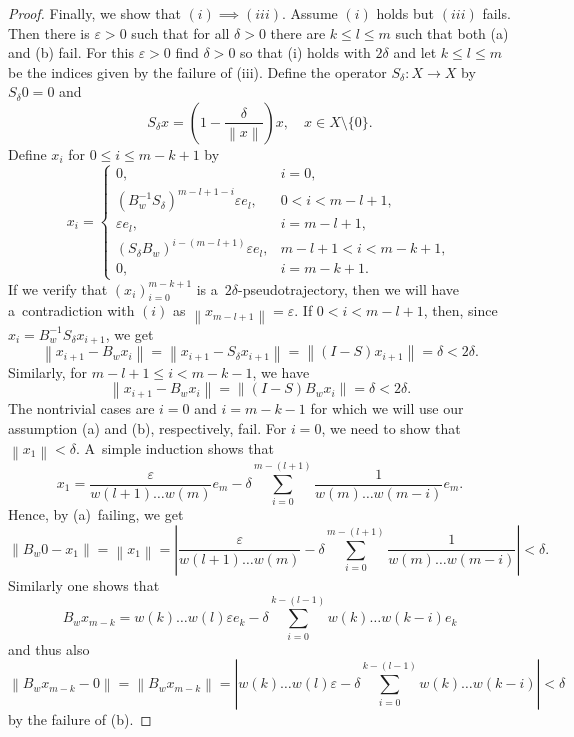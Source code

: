 \documentclass[11pt,a4paper]{amsart}
\theoremstyle{definition}
\newcommand{\eps}{\varepsilon}
\newcommand{\abs}[1]{\left| #1 \right|}
\newcommand{\norm}[1]{\left\| #1 \right\|}
\begin{document}
\begin{proof}
		Finally, we show that $(i) \implies (iii)$. Assume $(i)$ holds but $(iii)$ fails. Then there is $\eps > 0$ such that for all $\delta > 0$ there are $k \leq l \leq m$ such that both (a) and (b) fail. For this $\eps > 0$ find $\delta > 0$ so that (i) holds with $2\delta$ and let $k \leq l \leq m$ be the indices given by the failure of (iii). Define the operator $S_\delta: X \to X$ by $S_\delta0 = 0$ and
		\begin{equation*}
			S_\delta x = \left(1 - \frac{\delta}{\norm{x}}\right)x, \quad x \in X \setminus \{0\}.
		\end{equation*}	
		Define $x_i$ for $0 \leq i \leq m-k+1$ by
		\begin{equation*}
			x_i = \begin{cases}
				0, &i=0,\\
				(B_w^{-1} S_\delta)^{m-l+1 - i} \eps e_l, &0 < i < m-l+1,\\
				\eps e_l, & i = m-l+1,\\
				(S_\delta B_w)^{i-(m-l+1)} \eps e_l, & m-l+1 < i < m-k+1,\\
				0, &i=m-k+1.
			\end{cases}
		\end{equation*}
		If we verify that $(x_i)_{i=0}^{m-k+1}$ is a~$2\delta$-pseudotrajectory, then we will have a~contradiction with $(i)$ as $\norm{x_{m-l+1}} = \eps$. If $0 < i < m-l+1$, then, since $x_{i} = B_w^{-1}S_\delta x_{i+1}$, we get
		\begin{equation*}
			\norm{x_{i+1} - B_wx_i}
			=\norm{x_{i+1} - S_\delta x_{i+1}}
			=\norm{(I-S)x_{i+1}}
			= \delta < 2\delta.
		\end{equation*}
		Similarly, for $m-l+1 \leq i < m-k-1$, we have
		\begin{equation*}
			\norm{x_{i+1} - B_wx_i} = \norm{(I-S)B_w x_i} = \delta < 2\delta.
		\end{equation*}
		The nontrivial cases are $i = 0$ and $i = m-k-1$ for which we will use our assumption (a) and (b), respectively, fail. For $i = 0$, we need to show that $\norm{x_1} < \delta$. A~simple induction shows that
		\begin{equation*}
			x_1 = \frac{\varepsilon}{w(l+1)\dots w(m)} e_m- \delta \sum_{i=0}^{m-(l+1)}\frac{1}{w(m) \dots w(m-i)} e_{m}.
		\end{equation*}
		Hence, by (a)~failing, we get
		\begin{equation*}
			\norm{B_w0 - x_1}
			= \norm{x_1}
			= \abs{\frac{\varepsilon}{w(l+1)\dots w(m)} - \delta \sum_{i=0}^{m-(l+1)}\frac{1}{w(m) \dots w(m-i)}}
			< \delta.
		\end{equation*}
		Similarly one shows that
		\begin{equation*}
			B_w x_{m-k} = w(k) \dots w(l)\varepsilon e_k - \delta\sum_{i=0}^{k-(l-1)}w(k) \dots w(k-i) e_k
		\end{equation*}
		and thus also
		\begin{equation*}
			\norm{B_w x_{m-k} - 0}
			= \norm{B_w x_{m-k}}
			= \abs{w(k) \dots w(l)\varepsilon - \delta\sum_{i=0}^{k-(l-1)}w(k) \dots w(k-i)}
			< \delta
		\end{equation*}
		by the failure of (b).
	\end{proof}
	
\end{document}
